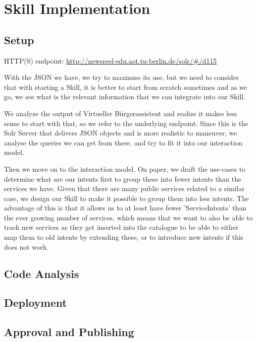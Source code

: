\chapter{Skill Implementation}%
\label{maintwo}

\section{Setup}

HTTP(S) endpoint:
\url{http://newsreel-edu.aot.tu-berlin.de/solr/#/d115}



With the JSON we have, we try to maximise its use, but we need to consider that with starting a Skill, it is better to start from scratch sometimes and as we go, we see what is the relevant information that we can integrate into our Skill.

We analyze the output of Virtueller Bürgerassistent and realize it makes less sense to start with that, so we refer to the underlying endpoint. Since this is the Solr Server that delivers JSON objects and is more realistic to maneuver, we analyse the queries we can get from there. and try to fit it into our interaction model.

Then we move on to the interaction model. On paper, we draft the use-cases to determine what are our intents first to group these into fewer intents than the services we have. Given that there are many public services related to a similar case, we design our Skill to make it possible to group them into less intents. The advantage of this is that it allows us to at least have fewer 'ServiceIntents' than the ever growing number of services, which means that we want to also be able to track new services as they get inserted into the catalogue to be able to either map them to old intents by extending these, or to introduce new intents if this does not work.


\section{Code Analysis}

\section{Deployment}

\section{Approval and Publishing}

